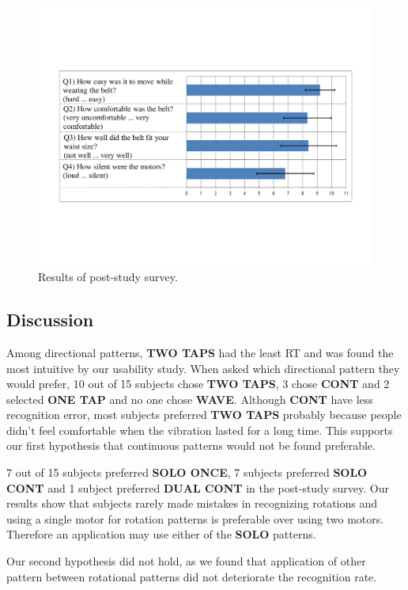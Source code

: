 \begin{figure}[ht!]
\centering
\includegraphics[trim=50 150 50 150,clip, width=1.0\textwidth]{pics/belt_survey}
\caption{Results of post-study survey.}
\label{fig:survey} 
\end{figure}

\subsection{Discussion}

Among directional patterns, \textbf{TWO TAPS} had the least RT and was found the most intuitive by our usability study. When asked which directional pattern they would prefer, 10 out of 15 subjects chose \textbf{TWO TAPS}, 3 chose \textbf{CONT} and 2 selected \textbf{ONE TAP} and no one chose \textbf{WAVE}. Although \textbf{CONT} have less recognition error, most subjects preferred \textbf{TWO TAPS} probably because people didn't feel comfortable when the vibration lasted for a long time. This supports our first hypothesis that continuous patterns would not be found preferable.

7 out of 15 subjects preferred \textbf{SOLO ONCE}, 7 subjects preferred \textbf{SOLO CONT} and 1 subject preferred \textbf{DUAL CONT} in the post-study survey. Our results show that subjects rarely made mistakes in recognizing rotations and using a single motor for rotation patterns is preferable over using two motors. Therefore an application may use either of the \textbf{SOLO} patterns. 

Our second hypothesis did not hold, as we found that application of other pattern between rotational patterns did not deteriorate the recognition rate.